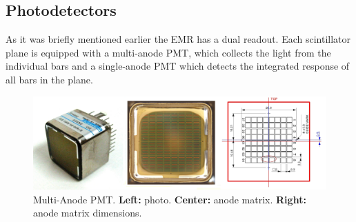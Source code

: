 \documentclass[a4paper,11pt]{article}
\begin{document}
\subsection{Photodetectors}
As it was briefly mentioned earlier the EMR has a dual readout. Each scintillator plane is equipped with a multi-anode PMT, which collects
the light from the individual bars and a single-anode PMT which detects the integrated response of all bars in the plane. 
\begin{figure}[h]
 \centering
 \includegraphics[width=\textwidth]{./mapmt}
 \caption[Multi-Anode PMT]{Multi-Anode PMT. {\bf Left:} photo. {\bf Center:} anode matrix. {\bf Right:} anode matrix dimensions.}
 \label{fig:mapmt}
\end{figure}
\end{document}
